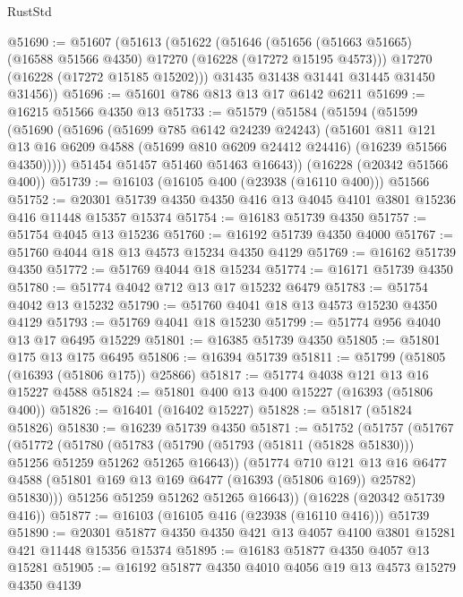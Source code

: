 \begin{lexlean}{RustStd}
\begin{coremodule}
@51690 := @51607
    (@51613
      (@51622
        (@51646
          (@51656 (@51663 @51665) (@16588 @51566 @4350) @17270 (@16228 (@17272 @15195 @4573)))
          @17270
          (@16228 (@17272 @15185 @15202)))
        @31435
        @31438
        @31441
        @31445
        @31450
        @31456))
@51696 := @51601 @786 @813 @13 @17 @6142 @6211
@51699 := @16215 @51566 @4350 @13
@51733 := @51579
    (@51584
      (@51594
        (@51599
          (@51690
            (@51696
              (@51699 @785 @6142 @24239 @24243)
              (@51601
                @811
                @121
                @13
                @16
                @6209
                @4588
                (@51699 @810 @6209 @24412 @24416)
                (@16239 @51566 @4350)))))
        @51454
        @51457
        @51460
        @51463
        @16643))
    (@16228 (@20342 @51566 @400))
@51739 := @16103 (@16105 @400 (@23938 (@16110 @400))) @51566
@51752 := @20301 @51739 @4350 @4350 @416 @13 @4045 @4101 @3801 @15236 @416 @11448 @15357 @15374
@51754 := @16183 @51739 @4350
@51757 := @51754 @4045 @13 @15236
@51760 := @16192 @51739 @4350 @4000
@51767 := @51760 @4044 @18 @13 @4573 @15234 @4350 @4129
@51769 := @16162 @51739 @4350
@51772 := @51769 @4044 @18 @15234
@51774 := @16171 @51739 @4350
@51780 := @51774 @4042 @712 @13 @17 @15232 @6479
@51783 := @51754 @4042 @13 @15232
@51790 := @51760 @4041 @18 @13 @4573 @15230 @4350 @4129
@51793 := @51769 @4041 @18 @15230
@51799 := @51774 @956 @4040 @13 @17 @6495 @15229
@51801 := @16385 @51739 @4350
@51805 := @51801 @175 @13 @175 @6495
@51806 := @16394 @51739
@51811 := @51799 (@51805 (@16393 (@51806 @175)) @25866)
@51817 := @51774 @4038 @121 @13 @16 @15227 @4588
@51824 := @51801 @400 @13 @400 @15227 (@16393 (@51806 @400))
@51826 := @16401 (@16402 @15227)
@51828 := @51817 (@51824 @51826)
@51830 := @16239 @51739 @4350
@51871 := @51752
    (@51757
      (@51767
        (@51772
          (@51780
            (@51783 (@51790 (@51793 (@51811 (@51828 @51830))) @51256 @51259 @51262 @51265 @16643))
            (@51774
              @710
              @121
              @13
              @16
              @6477
              @4588
              (@51801 @169 @13 @169 @6477 (@16393 (@51806 @169)) @25782)
              @51830)))
        @51256
        @51259
        @51262
        @51265
        @16643))
    (@16228 (@20342 @51739 @416))
@51877 := @16103 (@16105 @416 (@23938 (@16110 @416))) @51739
@51890 := @20301 @51877 @4350 @4350 @421 @13 @4057 @4100 @3801 @15281 @421 @11448 @15356 @15374
@51895 := @16183 @51877 @4350 @4057 @13 @15281
@51905 := @16192 @51877 @4350 @4010 @4056 @19 @13 @4573 @15279 @4350 @4139

\end{coremodule}
\end{lexlean}
